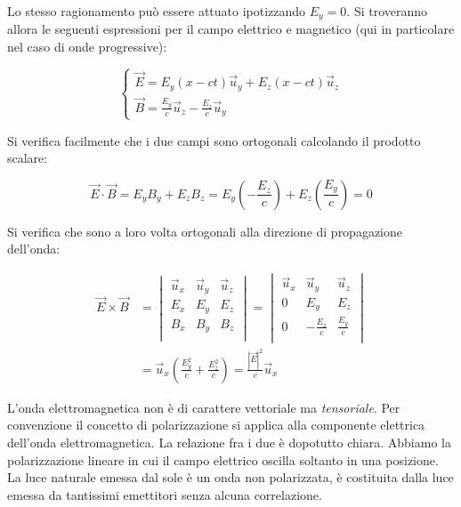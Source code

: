 Lo stesso ragionamento può essere attuato ipotizzando $E_y=0$. Si troveranno allora le seguenti espressioni per il campo elettrico e magnetico (qui in particolare nel caso di onde progressive):

\[
	\left\{ \begin{array}{l}
	 	\vec{E} = E_y(x-ct)\vec{u}_y + E_z(x-ct) \vec{u}_z \\
		\vec{B} = \frac{E_y}{c} \vec{u}_z -\frac{E_z}{c}\vec{u}_y
	\end{array} \right.
\]

Si verifica facilmente che i due campi sono ortogonali calcolando il prodotto scalare:

\[
	\vec{E} \cdot \vec{B} = E_yB_y + E_zB_z = E_y\left( -\frac{E_z}{c} \right) +E_z \left( \frac{E_y}{c} \right)   = 0
\]

Si verifica che sono a loro volta ortogonali alla direzione di propagazione dell'onda:

\begin{equation*}
	\begin{aligned}
		\vec{E} \times \vec{B} &= \begin{vmatrix}
		\vec{u}_x & \vec{u}_y & \vec{u}_z \\
		E_x & E_y & E_z \\
		B_x & B_y & B_z \\
		\end{vmatrix}
		= \begin{vmatrix}
		\vec{u}_x & \vec{u}_y & \vec{u}_z \\
		0 & E_y & E_z \\
		0 & -\frac{E_z}{c} & \frac{E_y}{c} \\
		\end{vmatrix} \\
		&= \vec{u}_x\left( \frac{E_y^2}{c} + \frac{E_z^2}{c} \right) = \frac{|\vec{E}|^2}{c} \vec{u}_x
	\end{aligned}
\end{equation*}

L'onda elettromagnetica non è di carattere vettoriale ma \emph{tensoriale}. Per convenzione il concetto di polarizzazione si applica alla componente elettrica dell'onda elettromagnetica. La relazione fra i due è dopotutto chiara. Abbiamo la polarizzazione lineare in cui il campo elettrico oscilla soltanto in una posizione. La luce naturale emessa dal sole è un onda non polarizzata, è costituita dalla luce emessa da tantissimi emettitori senza alcuna correlazione.

